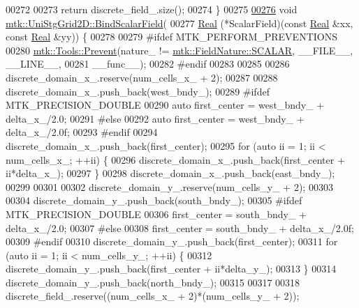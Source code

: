 \begin{DoxyCode}
00272 
00273   \textcolor{keywordflow}{return} discrete\_field\_.size();
00274 \}
00275 
\hypertarget{mtk__uni__stg__grid__2d_8cc_source_l00276}{}\hyperlink{classmtk_1_1UniStgGrid2D_a5f9910ffb94e0314b16c026c4b5762ee}{00276} \textcolor{keywordtype}{void} \hyperlink{classmtk_1_1UniStgGrid2D_a5f9910ffb94e0314b16c026c4b5762ee}{mtk::UniStgGrid2D::BindScalarField}(
00277     \hyperlink{group__c01-roots_gac080bbbf5cbb5502c9f00405f894857d}{Real} (*ScalarField)(\textcolor{keyword}{const} \hyperlink{group__c01-roots_gac080bbbf5cbb5502c9f00405f894857d}{Real} &xx, \textcolor{keyword}{const} \hyperlink{group__c01-roots_gac080bbbf5cbb5502c9f00405f894857d}{Real} &yy)) \{
00278 
00279 \textcolor{preprocessor}{  #ifdef MTK\_PERFORM\_PREVENTIONS}
00280   \hyperlink{classmtk_1_1Tools_a332324c6f25e66be9dff48c5987a3b9f}{mtk::Tools::Prevent}(nature\_ != \hyperlink{namespacemtk_ga4c54f2a329cfb4e56213b02a259d19e2a8f3d9a4b6a7b7f2c7afa61ca113d0db9}{mtk::FieldNature::SCALAR}, 
      \_\_FILE\_\_, \_\_LINE\_\_,
00281 \_\_func\_\_);
00282 \textcolor{preprocessor}{  #endif}
00283 
00285 
00286   discrete\_domain\_x\_.reserve(num\_cells\_x\_ + 2);
00287 
00288   discrete\_domain\_x\_.push\_back(west\_bndy\_);
00289 \textcolor{preprocessor}{  #ifdef MTK\_PRECISION\_DOUBLE}
00290   \textcolor{keyword}{auto} first\_center = west\_bndy\_ + delta\_x\_/2.0;
00291 \textcolor{preprocessor}{  #else}
00292   \textcolor{keyword}{auto} first\_center = west\_bndy\_ + delta\_x\_/2.0f;
00293 \textcolor{preprocessor}{  #endif}
00294   discrete\_domain\_x\_.push\_back(first\_center);
00295   \textcolor{keywordflow}{for} (\textcolor{keyword}{auto} ii = 1; ii < num\_cells\_x\_; ++ii) \{
00296     discrete\_domain\_x\_.push\_back(first\_center + ii*delta\_x\_);
00297   \}
00298   discrete\_domain\_x\_.push\_back(east\_bndy\_);
00299 
00301 
00302   discrete\_domain\_y\_.reserve(num\_cells\_y\_ + 2);
00303 
00304   discrete\_domain\_y\_.push\_back(south\_bndy\_);
00305 \textcolor{preprocessor}{  #ifdef MTK\_PRECISION\_DOUBLE}
00306   first\_center = south\_bndy\_ + delta\_x\_/2.0;
00307 \textcolor{preprocessor}{  #else}
00308   first\_center = south\_bndy\_ + delta\_x\_/2.0f;
00309 \textcolor{preprocessor}{  #endif}
00310   discrete\_domain\_y\_.push\_back(first\_center);
00311   \textcolor{keywordflow}{for} (\textcolor{keyword}{auto} ii = 1; ii < num\_cells\_y\_; ++ii) \{
00312     discrete\_domain\_y\_.push\_back(first\_center + ii*delta\_y\_);
00313   \}
00314   discrete\_domain\_y\_.push\_back(north\_bndy\_);
00315 
00317 
00318   discrete\_field\_.reserve((num\_cells\_x\_ + 2)*(num\_cells\_y\_ + 2));

\end{DoxyCode}
